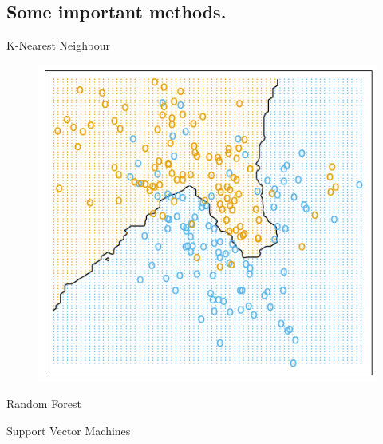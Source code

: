 \documentclass{beamer}
\begin{document}
\subsection{Some important methods.}
\frame{
\tableofcontents[ 
    currentsubsection, 
    sectionstyle=show/hide, 
    sectionstyle=show/shaded, 
    ] 
}


\begin{frame}{K-Nearest Neighbour}
 \begin{figure}[ht!]
 \centering
 \includegraphics[scale=0.5]{knn.png}
\end{figure}

\end{frame}

\begin{frame}{Random Forest}
\begin{center}
\end{center}
\end{frame}



\begin{frame}{Support Vector Machines}
\begin{center}
\end{center}
\end{frame}
\end{document}
